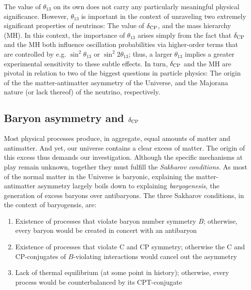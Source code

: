 \documentclass[../thesis.tex]{subfiles}
\begin{document}
The value of $\theta_{13}$ on its own does not carry any particularly meaningful physical significance. However, $\theta_{13}$ is important in the context of unraveling two extremely significant properties of neutrinos: The value of $\delta_\text{CP}$, and the mass hierarchy (MH). In this context, the importance of $\theta_{13}$ arises simply from the fact that $\delta_\text{CP}$ and the MH both influence oscillation probabilities via higher-order terms that are controlled by e.g. \(\sin^2\theta_{13}\) or \(\sin^2 2\theta_{13}\); thus, a larger $\theta_{13}$ implies a greater experimental sensitivity to these subtle effects. In turn, $\delta_\text{CP}$ and the MH are pivotal in relation to two of the biggest questions in particle physics: The origin of the the matter-antimatter asymmetry of the Universe, and the Majorana nature (or lack thereof) of the neutrino, respectively.

\subsection{Baryon asymmetry and $\delta_\text{CP}$}
\label{sec:baryonAsym}

Most physical processes produce, in aggregate, equal amounts of matter and antimatter. And yet, our universe contains a clear excess of matter. The origin of this excess thus demands our investigation. Although the specific mechanisms at play remain unknown, together they must fulfill the \emph{Sakharov conditions.} As most of the normal matter in the Universe is baryonic, explaining the matter-antimatter asymmetry largely boils down to explaining \emph{baryogenesis,} the generation of excess baryons over antibaryons. The three Sakharov conditions, in the context of baryogensis, are:

\begin{enumerate}
\item Existence of processes that violate baryon number symmetry $B$; otherwise, every baryon would be created in concert with an antibaryon
\item Existence of processes that violate C and CP symmetry; otherwise the C and CP-conjugates of $B$-violating interactions would cancel out the asymmetry
\item Lack of thermal equilibrium (at some point in history); otherwise, every process would be counterbalanced by its CPT-conjugate
\end{enumerate}
\end{document}
